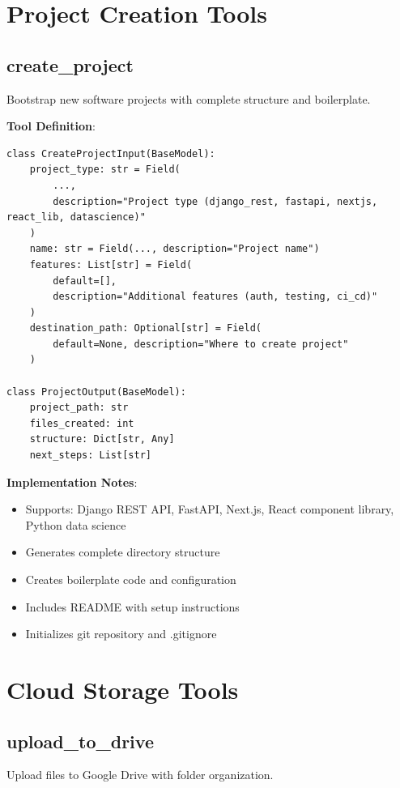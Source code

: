 \documentclass{report}
\begin{document}
\section{Project Creation Tools}

\subsection{create\_project}

Bootstrap new software projects with complete structure and boilerplate.

\textbf{Tool Definition}:
\begin{lstlisting}
class CreateProjectInput(BaseModel):
    project_type: str = Field(
        ...,
        description="Project type (django_rest, fastapi, nextjs, react_lib, datascience)"
    )
    name: str = Field(..., description="Project name")
    features: List[str] = Field(
        default=[],
        description="Additional features (auth, testing, ci_cd)"
    )
    destination_path: Optional[str] = Field(
        default=None, description="Where to create project"
    )

class ProjectOutput(BaseModel):
    project_path: str
    files_created: int
    structure: Dict[str, Any]
    next_steps: List[str]
\end{lstlisting}

\textbf{Implementation Notes}:
\begin{itemize}
    \item Supports: Django REST API, FastAPI, Next.js, React component library, Python data science
    \item Generates complete directory structure
    \item Creates boilerplate code and configuration
    \item Includes README with setup instructions
    \item Initializes git repository and .gitignore
\end{itemize}

\section{Cloud Storage Tools}

\subsection{upload\_to\_drive}

Upload files to Google Drive with folder organization.
\end{document}
